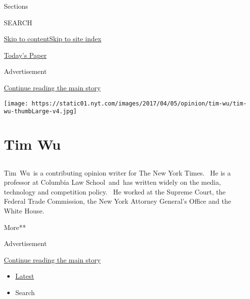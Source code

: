Sections

SEARCH

\protect\hyperlink{site-content}{Skip to
content}\protect\hyperlink{site-index}{Skip to site index}

\href{https://myaccount.nytimes.com/auth/login?response_type=cookie\&client_id=vi}{}

\href{https://www.nytimes.com/section/todayspaper}{Today's Paper}

Advertisement

\protect\hyperlink{after-top}{Continue reading the main story}

\texttt{[image: https://static01.nyt.com/images/2017/04/05/opinion/tim-wu/tim-wu-thumbLarge-v4.jpg]}

\hypertarget{tim-wu}{%
\section{Tim Wu}\label{tim-wu}}

\subsection{}

Tim~Wu~is a contributing opinion writer for The New York Times.~ He is a
professor at Columbia Law School~and~has written widely on the media,
technology and competition policy.~ He worked at the Supreme Court, the
Federal Trade Commission, the New York Attorney General's Office and the
White House. ~~

More**

Advertisement

\protect\hyperlink{after-mid1}{Continue reading the main story}

\begin{itemize}
\tightlist
\item
  \protect\hyperlink{stream-panel}{Latest}
\item
  Search
\end{itemize}

